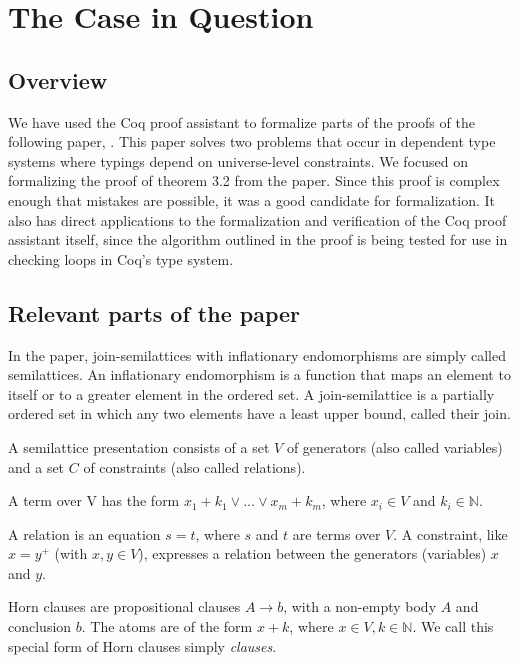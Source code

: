 \chapter{The Case in Question}

\section{Overview}

We have used the Coq proof assistant to formalize parts of the proofs of the following paper, \citeauthor{mbezem} \cite{mbezem}.
This paper solves two problems that occur in dependent type systems where typings depend
on universe-level constraints. We focused on formalizing the proof of theorem 3.2 from the paper.
Since this proof is complex enough that mistakes are possible, it was a good candidate for formalization.
It also has direct applications to the formalization and verification of the Coq proof assistant itself,
since the algorithm outlined in the proof is being tested
for use in checking loops in Coq's type system. \cite{coqgithub}

\section{Relevant parts of the paper}

In the paper, join-semilattices with inflationary endomorphisms
are simply called semilattices. An inflationary endomorphism is a function
that maps an element to itself or to a greater element in the ordered set.
A join-semilattice is a partially ordered set in which any two elements have a least upper bound,
called their join.

A semilattice presentation consists of a set $V$ of generators
(also called variables) and a set $C$ of constraints
(also called relations).

A term over V has the form $x_1 + k_1 \lor \ldots \lor x_m + k_m$, where $x_i \in V$ and $k_i \in \mathbb{N}$.

A relation is an equation $s = t$, where $s$ and $t$ are terms over $V$.
A constraint, like $x = y^+$ (with $x, y \in V$), expresses a relation between the generators (variables) $x$ and $y$.

Horn clauses are propositional clauses $A \rightarrow b$, with a non-empty body $A$ and conclusion $b$.
The atoms are of the form $x + k$, where $x \in V, k \in \mathbb{N}$.
We call this special form of Horn clauses simply \textit{clauses}.


